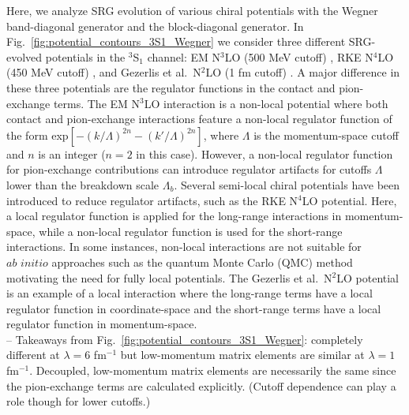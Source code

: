 \documentclass[preprintnumbers,floatfix,aps,prc,preprint,nofootinbib]{revtex4-1}
\begin{document}
%
Here, we analyze SRG evolution of various chiral potentials with the Wegner band-diagonal generator and the block-diagonal generator. In Fig.~\ref{fig:potential_contours_3S1_Wegner} we consider three different SRG-evolved potentials in the $^3$S$_1$ channel: EM N$^3$LO (500 MeV cutoff) \cite{Entem:2003ft}, RKE N$^4$LO (450 MeV cutoff) \cite{Reinert:2017usi}, and Gezerlis et al.~N$^2$LO (1 fm cutoff) \cite{Gezerlis:2014zia}. A major difference in these three potentials are the regulator functions in the contact and pion-exchange terms. The EM N$^3$LO interaction is a non-local potential where both contact and pion-exchange interactions feature a non-local regulator function of the form exp$[-(k/\Lambda)^{2n}-(k'/\Lambda)^{2n}]$, where $\Lambda$ is the momentum-space cutoff and $n$ is an integer ($n=2$ in this case). However, a non-local regulator function for pion-exchange contributions can introduce regulator artifacts for cutoffs $\Lambda$ lower than the breakdown scale $\Lambda_b$. Several semi-local chiral potentials have been introduced to reduce regulator artifacts, such as the RKE N$^4$LO potential. Here, a local regulator function is applied for the long-range interactions in momentum-space, while a non-local regulator function is used for the short-range interactions. In some instances, non-local interactions are not suitable for $\textit{ab initio}$ approaches such as the quantum Monte Carlo (QMC) method motivating the need for fully local potentials. The Gezerlis et al.~N$^2$LO potential is an example of a local interaction where the long-range terms have a local regulator function in coordinate-space and the short-range terms have a local regulator function in momentum-space.
\\
-- Takeaways from Fig.~\ref{fig:potential_contours_3S1_Wegner}: completely different at $\lambda=6$ fm$^{-1}$ but low-momentum matrix elements are similar at $\lambda=1$ fm$^{-1}$. Decoupled, low-momentum matrix elements are necessarily the same since the pion-exchange terms are calculated explicitly. (Cutoff dependence can play a role though for lower cutoffs.)
\end{document}
